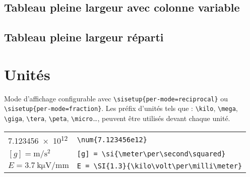 \documentclass{article}
\let\code\lstinline
\begin{document}
\begin{multicols*}{3}
\subsection*{Tableau pleine largeur avec colonne variable}

\subsection*{Tableau pleine largeur réparti}

\section*{Unités}
Mode d'affichage configurable avec \code+\sisetup{per-mode=reciprocal}+ ou \code+\sisetup{per-mode=fraction}+. Les préfix d'unités tels que : \code+\kilo+, \code+\mega+, \code+\giga+, \code+\tera+, \code+\peta+, \code+\micro+\dots, peuvent être utilisés devant chaque unité.
\begin{tabular}{ll}
  \num{7.123456e12} & \code+\num{7.123456e12}+ \\[1em]
	$[g] = \si{\meter \per \second \squared}$ & \code#[g] = \si{\meter\per\second\squared}#\\[1em]
	$E = \SI[per-mode=fraction]{3.7}{\kilo\micro\volt\per\milli\meter}$ & \code#E = \SI{1.3}{\kilo\volt\per\milli\meter}#\\
\end{tabular}


\end{multicols*}
\end{document}

